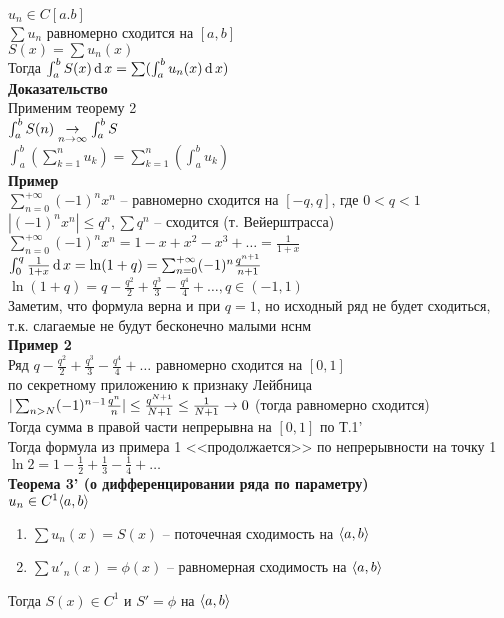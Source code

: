 \documentclass[12pt]{article}
\begin{document}
$u_n \in C[a.b]$\\
$\sum u_n$ равномерно сходится на $[a,b]$\\
$S(x)=\sum u_n(x)$\\
Тогда $\int_a^b S(x) \operatorname{d} x = \sum (\int_a^b u_n(x)\operatorname{d} x)$\\
\textbf{Доказательство}\\
Применим теорему 2\\
$\int_a^b S(n) \underset{n\rightarrow\infty}{\rightarrow} \int_a^b S$\\
$\int_a^b (\sum_{k=1}^n u_k) = \sum_{k=1}^n(\int_a^b u_k)$\\
\textbf{Пример}\\
$\sum_{n=0}^{+\infty} (-1)^nx^n$ -- равномерно сходится на $[-q,q]$, где $0<q<1$\\
$|(-1)^nx^n| \leq q^n, \sum q^n$ -- сходится (т. Вейерштрасса)\\
$\sum_{n=0}^{+\infty} (-1)^nx^n = 1 - x + x^2 - x^3 + \ldots = \frac1{1+x}$
$\int_0^q \frac1{1+x}\operatorname{d} x = \ln(1+q) = \sum_{n=0}^{+\infty} (-1)^n \frac{q^{n+1}}{n+1}$\\
$\ln (1+q) = q-\frac{q^2}2+\frac{q^3}3-\frac{q^4}4 +\ldots, q \in (-1, 1)$\\
Заметим, что формула верна и при $q=1$, но исходный ряд не будет сходиться, т.к. слагаемые не будут бесконечно малыми нснм\\
\textbf{Пример 2}\\
Ряд $q-\frac{q^2}2+\frac{q^3}3-\frac{q^4}4 +\ldots$ равномерно сходится на $[0,1]$\\
по секретному приложению к признаку Лейбница\\
$|\sum_{n>N}(-1)^{n-1}\frac{q^n}n| \leq \frac{q^{N+1}}{N+1}\leq \frac1{N+1} \rightarrow 0$ (тогда равномерно сходится)\\
Тогда сумма в правой части непрерывна на $[0,1]$ по Т.1'\\
Тогда формула из примера 1 <<продолжается>> по непрерывности на точку 1\\
$\ln 2 = 1 - \frac12 + \frac13 - \frac14 + \ldots$\\
\textbf{Теорема 3' (о дифференцировании ряда по параметру)}\\
$u_n \in C^1\langle a, b \rangle$
\begin{enumerate}
    \item $\sum u_n (x) = S(x)$ -- поточечная сходимость на $\langle a, b \rangle$
    \item $\sum u'_n(x) = \phi(x)$ -- равномерная сходимость на $\langle a, b \rangle$
\end{enumerate}
Тогда $S(x)\in C^1$ и $S' = \phi$ на $\langle a, b \rangle$\\
\end{document}
